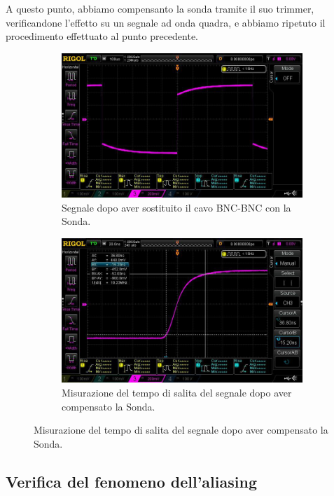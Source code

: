 \documentclass{article}
\begin{document}
				\newpage
				A questo punto, abbiamo compensanto la sonda tramite il suo trimmer, verificandone l'effetto su un segnale ad onda quadra, e abbiamo ripetuto il procedimento effettuato al punto precedente.
				\begin{figure}[h!]
					\centering
					\begin{subfigure}{0.4\textwidth}
						\centering
						\includegraphics[scale=0.2]{tempoSalitaSondaNonCompensata}
						\caption{Segnale dopo aver sostituito il cavo BNC-BNC con la Sonda.}
					\end{subfigure}
					\begin{subfigure}{0.4\textwidth}
						\centering
						\includegraphics[scale=0.2]{tempoSalitaSondaCompensata}
						\caption{Misurazione del tempo di salita del segnale dopo aver compensato la Sonda.}
					\end{subfigure}
					\label{fig:tempoSalitaSonda}
				\end{figure}
		\subsection{Verifica del fenomeno dell’aliasing}
\end{document}
